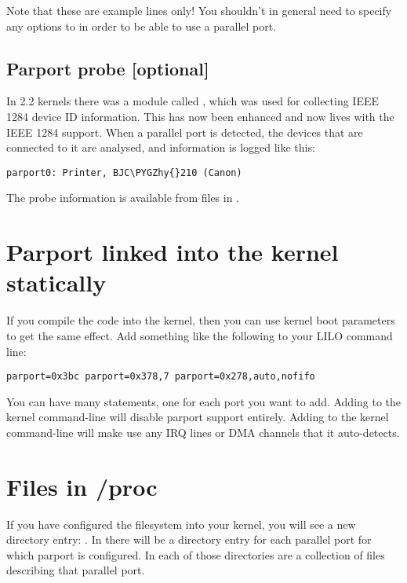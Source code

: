 \documentclass[a4paper,8pt,english]{sphinxmanual}
\def\PYGZhy{\char`\-}
\begin{document}
Note that these are example lines only!  You shouldn't in general need
to specify any options to  in order to be able to use a
parallel port.


\subsection{Parport probe {[}optional{]}}
\label{admin-guide/parport:parport-probe-optional}
In 2.2 kernels there was a module called , which was used
for collecting IEEE 1284 device ID information.  This has now been
enhanced and now lives with the IEEE 1284 support.  When a parallel
port is detected, the devices that are connected to it are analysed,
and information is logged like this:

\begin{Verbatim}[commandchars=\\\{\}]
parport0: Printer, BJC\PYGZhy{}210 (Canon)
\end{Verbatim}

The probe information is available from files in .


\section{Parport linked into the kernel statically}
\label{admin-guide/parport:parport-linked-into-the-kernel-statically}
If you compile the  code into the kernel, then you can use
kernel boot parameters to get the same effect.  Add something like the
following to your LILO command line:

\begin{Verbatim}[commandchars=\\\{\}]
parport=0x3bc parport=0x378,7 parport=0x278,auto,nofifo
\end{Verbatim}

You can have many  statements, one for each port you want
to add.  Adding  to the kernel command-line will disable
parport support entirely.  Adding  to the kernel
command-line will make  use any IRQ lines or DMA channels that
it auto-detects.


\section{Files in /proc}
\label{admin-guide/parport:files-in-proc}
If you have configured the  filesystem into your kernel, you will
see a new directory entry: .  In there will be a
directory entry for each parallel port for which parport is
configured.  In each of those directories are a collection of files
describing that parallel port.
\end{document}
